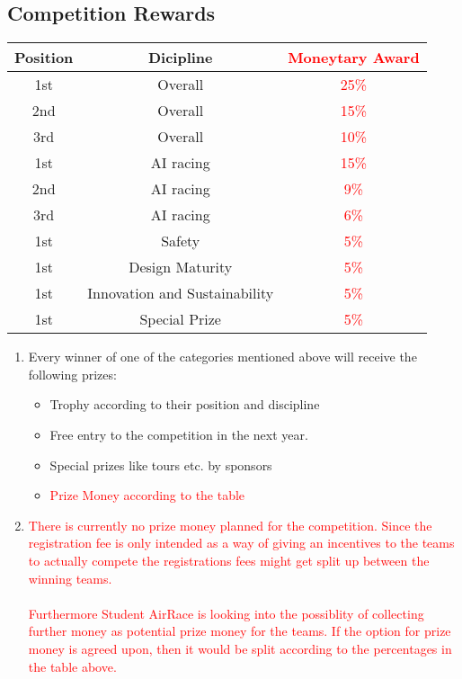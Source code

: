     \subsection{Competition Rewards}
    \begin{center}
        \begin{tabular}{|c|c|c|} 
          \hline
          Position & Dicipline & \textcolor{red}{Moneytary Award} \\
          \hline
          1st & Overall & \textcolor{red}{25\%} \\ 
          \hline
          2nd  & Overall & \textcolor{red}{15\%} \\ 
          \hline
          3rd & Overall & \textcolor{red}{10\%} \\ 
          \hline
          1st & AI racing & \textcolor{red}{15\%} \\ 
          \hline
          2nd  & AI racing & \textcolor{red}{9\%} \\ 
          \hline
          3rd & AI racing & \textcolor{red}{6\%} \\ 
          \hline
          1st & Safety & \textcolor{red}{5\%} \\ 
          \hline
          1st & Design Maturity & \textcolor{red}{5\%} \\ 
          \hline
          1st & Innovation and Sustainability & \textcolor{red}{5\%} \\ 
          \hline
          1st & Special Prize & \textcolor{red}{5\%} \\ 
          \hline
        \end{tabular}
      \end{center}
      

    \begin{enumerate}
      \item Every winner of one of the categories mentioned above will receive the following prizes:
      
      \begin{itemize}
        \item Trophy according to their position and discipline
        \item Free entry to the competition in the next year.
        \item Special prizes like tours etc. by sponsors
        \item \textcolor{red}{Prize Money according to the table}
      \end{itemize}

      \item \textcolor{red}{There is currently no prize money planned for the competition. Since the registration fee is only intended as a way of giving an incentives to the teams to actually compete the registrations fees might get split up between the winning teams. \\ \\ Furthermore Student AirRace is looking into 
      the possiblity of collecting further money as potential prize money for the teams. If the option for prize money is agreed upon, then it would be split according to the percentages in the table above. }
    \end{enumerate}



